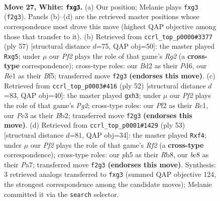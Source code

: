 \documentclass[11pt]{article}
\begin{document}
\clearpage

\begin{figure}[p]\centering
\begin{subfigure}{0.46\textwidth}\centering
\resizebox{\linewidth}{!}{%
\newchessgame
\chessboard[
  setfen={r1bq1rk1/8/8/2p1p2p/7P/p1P3p1/P2B1P2/1R1QR1K1 w - - 0 27},
  showmover=false,
  pgfstyle=straightmove, color=movearrow, markmove={f2-g3}
]}
\caption{}
\end{subfigure}\hfill
\begin{subfigure}{0.46\textwidth}\centering
\resizebox{\linewidth}{!}{%
\newchessgame
\chessboard[
  setfen={1r6/p4qrk/1p1p3p/5bP1/1PPQ4/P5B1/3K1P2/2R3R1 b - - 0 29},
  showmover=false,
  pgfstyle=straightmove, color=movearrow, markmove={g7-g5}
]}
\caption{}
\end{subfigure}
\\[4pt]
\begin{subfigure}{0.46\textwidth}\centering
\resizebox{\linewidth}{!}{%
\newchessgame
\chessboard[
  setfen={2r2rk1/1p3pp1/7p/pP1Q4/P4P2/4q2b/1B4P1/2RR3K w - - 0 27},
  showmover=false,
  pgfstyle=straightmove, color=movearrow, markmove={g2-h3}
]}
\caption{}
\end{subfigure}\hfill
\begin{subfigure}{0.46\textwidth}\centering
\resizebox{\linewidth}{!}{%
\newchessgame
\chessboard[
  setfen={1r5k/p2q1rb1/7p/8/PpQP1P2/8/1P3PB1/1K1R2R1 b - - 0 27},
  showmover=false,
  pgfstyle=straightmove, color=movearrow, markmove={f7-f4}
]}
\caption{}
\end{subfigure}
\caption{\textbf{Move 27, White: \texttt{fxg3}.} (a) Our position; Melanie plays \texttt{fxg3} (\texttt{f2g3}). Panels (b)--(d) are the retrieved master positions whose correspondence most drove this move (highest QAP objective among those that transfer to it). (b) Retrieved from \texttt{ccrl\_top\_p0000\#3377} (ply 57) [structural distance $d$=75, QAP obj=50]: the master played \texttt{Rxg5}; under $\mu$ our \emph{Pf2} plays the role of that game's \emph{Rg2} (a \textbf{cross-type} correspondence); cross-type roles: our \emph{B}d2 as their \emph{P}d6, our \emph{R}e1 as their \emph{B}f5; transferred move \texttt{f2g3} \textbf{(endorses this move)}. (c) Retrieved from \texttt{ccrl\_top\_p0003\#416} (ply 52) [structural distance $d$=83, QAP obj=40]: the master played \texttt{gxh3}; under $\mu$ our \emph{Pf2} plays the role of that game's \emph{Pg2}; cross-type roles: our \emph{P}f2 as their \emph{R}c1, our \emph{P}c3 as their \emph{B}b2; transferred move \texttt{f2g3} \textbf{(endorses this move)}. (d) Retrieved from \texttt{ccrl\_top\_p0001\#1429} (ply 53) [structural distance $d$=81, QAP obj=34]: the master played \texttt{Rxf4}; under $\mu$ our \emph{Pf2} plays the role of that game's \emph{Rf2} (a \textbf{cross-type} correspondence); cross-type roles: our \emph{p}h5 as their \emph{R}b8, our \emph{b}c8 as their \emph{P}a7; transferred move \texttt{f2g3} \textbf{(endorses this move)}. Synthesis: 3 retrieved analogs transferred to \texttt{fxg3} (summed QAP objective 124, the strongest correspondence among the candidate moves); Melanie committed it via the \texttt{search} selector.}
\label{fig:thought-m52}
\end{figure}
\end{document}
